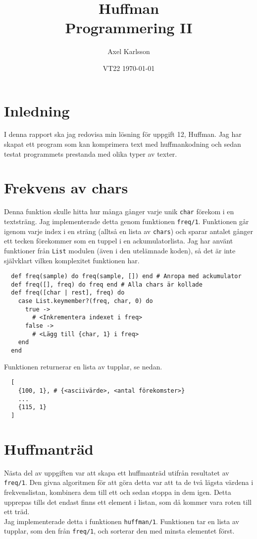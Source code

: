 \documentclass[a4paper,11pt]{article}
\begin{document}
\title{
  \textbf{Huffman\\
  \small Programmering II}
}
\author{Axel Karlsson}
\date{VT22 \today}

\maketitle

\section*{Inledning}
I denna rapport ska jag redovisa min lösning för uppgift 12, Huffman. Jag har skapat ett program som kan komprimera text med huffmankodning och sedan testat programmets prestanda med olika typer av texter. 


\section*{Frekvens av chars}
Denna funktion skulle hitta hur många gånger varje unik {\tt char} förekom i en textsträng. Jag implementerade detta genom funktionen {\tt freq/1}. Funktionen går igenom varje index i en sträng (alltså en lista av {\tt chars}) och sparar antalet gånger ett tecken förekommer som en tuppel i en ackumulatorlista. Jag har använt funktioner från {\tt List} modulen (även i den utelämnade koden), så det är inte självklart vilken komplexitet funktionen har.

\begin{verbatim}
  def freq(sample) do freq(sample, []) end # Anropa med ackumulator
  def freq([], freq) do freq end # Alla chars är kollade
  def freq([char | rest], freq) do
    case List.keymember?(freq, char, 0) do
      true ->
        # <Inkrementera indexet i freq>
      false ->
        # <Lägg till {char, 1} i freq>
    end
  end
\end{verbatim}
Funktionen returnerar en lista av tupplar, se nedan.
\begin{verbatim}
  [
    {100, 1}, # {<asciivärde>, <antal förekomster>}
    ...
    {115, 1}
  ]
\end{verbatim}

\section*{Huffmanträd}
Nästa del av uppgiften var att skapa ett huffmanträd utifrån resultatet av {\tt freq/1}. Den givna algoritmen för att göra detta var att ta de två lägsta värdena i frekvenslistan, kombinera dem till ett och sedan stoppa in dem igen. Detta upprepas tills det endast finns ett element i listan, som då kommer vara roten till ett träd.\\
Jag implementerade detta i funktionen {\tt huffman/1}. Funktionen tar en lista av tupplar, som den från {\tt freq/1}, och sorterar den med minsta elementet först.
\end{document}
